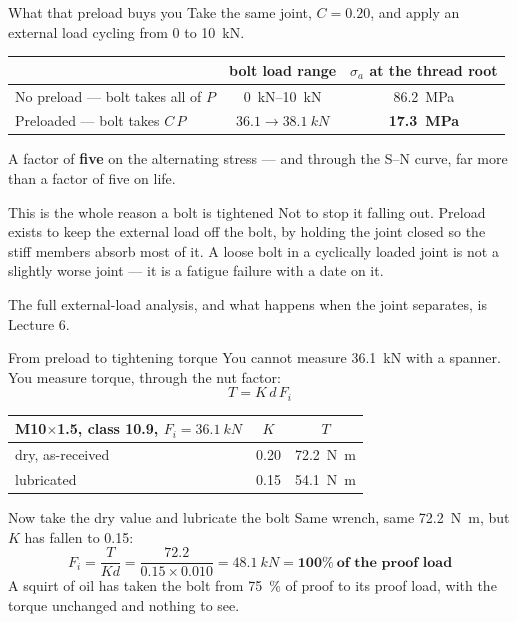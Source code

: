 \documentclass[aspectratio=169,10pt]{beamer}
\begin{document}
\begin{frame}{What that preload buys you}
Take the same joint, $C=0.20$, and apply an external load cycling from 0 to \SI{10}{kN}.
\vfill
\centering\small
\begin{tabular}{@{}lcc@{}}
\toprule
 & bolt load range & $\sigma_a$ at the thread root\\
\midrule
No preload --- bolt takes all of $P$ & \SIrange{0}{10}{kN} & \SI{86.2}{MPa}\\
Preloaded --- bolt takes $C\,P$ & $36.1 \to \SI{38.1}{kN}$ & \alert{\textbf{\SI{17.3}{MPa}}}\\
\bottomrule
\end{tabular}
\vfill
\raggedright
A factor of \textbf{five} on the alternating stress --- and through the S--N curve, far more than a
factor of five on life.
\vfill
\begin{alertblock}{This is the whole reason a bolt is tightened}
Not to stop it falling out. \alert{Preload exists to keep the external load off the bolt}, by holding
the joint closed so the stiff members absorb most of it. A loose bolt in a cyclically loaded joint is
not a slightly worse joint --- it is a fatigue failure with a date on it.
\end{alertblock}
\vfill
{\small The full external-load analysis, and what happens when the joint separates, is Lecture 6.}
\end{frame}

\begin{frame}{From preload to tightening torque}
You cannot measure \SI{36.1}{kN} with a spanner. You measure torque, through the nut factor:
\[ \boxed{\;T = K\,d\,F_i\;} \]
\vfill
\centering\small
\begin{tabular}{@{}lcc@{}}
\toprule
M10$\times$1.5, class 10.9, $F_i=\SI{36.1}{kN}$ & $K$ & $T$\\
\midrule
dry, as-received & 0.20 & \SI{72.2}{N.m}\\
lubricated & 0.15 & \SI{54.1}{N.m}\\
\bottomrule
\end{tabular}
\vfill
\raggedright
\begin{alertblock}{Now take the dry value and lubricate the bolt}
Same wrench, same \SI{72.2}{N.m}, but $K$ has fallen to 0.15:
\[ F_i = \frac{T}{K d} = \frac{72.2}{0.15\times0.010} = \SI{48.1}{kN}
   = \mathbf{100\%\ \text{of the proof load}} \]
\alert{A squirt of oil has taken the bolt from \SI{75}{\percent} of proof to its proof load, with the
torque unchanged and nothing to see.}
\end{alertblock}
\end{frame}
\end{document}
